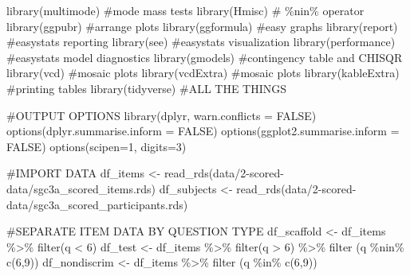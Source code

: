 \documentclass[
  letterpaper,
  DIV=11,
  numbers=noendperiod]{scrreprt}
\newenvironment{Shaded}{\begin{snugshade}}{\end{snugshade}}
\newcommand{\AttributeTok}[1]{\textcolor[rgb]{0.40,0.45,0.13}{#1}}
\newcommand{\CommentTok}[1]{\textcolor[rgb]{0.37,0.37,0.37}{#1}}
\newcommand{\ConstantTok}[1]{\textcolor[rgb]{0.56,0.35,0.01}{#1}}
\newcommand{\DecValTok}[1]{\textcolor[rgb]{0.68,0.00,0.00}{#1}}
\newcommand{\FunctionTok}[1]{\textcolor[rgb]{0.28,0.35,0.67}{#1}}
\newcommand{\NormalTok}[1]{\textcolor[rgb]{0.00,0.23,0.31}{#1}}
\newcommand{\OtherTok}[1]{\textcolor[rgb]{0.00,0.23,0.31}{#1}}
\newcommand{\SpecialCharTok}[1]{\textcolor[rgb]{0.37,0.37,0.37}{#1}}
\newcommand{\StringTok}[1]{\textcolor[rgb]{0.13,0.47,0.30}{#1}}
\begin{document}
\begin{Shaded}
\begin{Highlighting}[]
\FunctionTok{library}\NormalTok{(multimode) }\CommentTok{\#mode mass tests}
\FunctionTok{library}\NormalTok{(Hmisc) }\CommentTok{\# \%nin\% operator}
\FunctionTok{library}\NormalTok{(ggpubr) }\CommentTok{\#arrange plots}
\FunctionTok{library}\NormalTok{(ggformula) }\CommentTok{\#easy graphs}
\FunctionTok{library}\NormalTok{(report) }\CommentTok{\#easystats reporting}
\FunctionTok{library}\NormalTok{(see) }\CommentTok{\#easystats visualization}
\FunctionTok{library}\NormalTok{(performance) }\CommentTok{\#easystats model diagnostics}
\FunctionTok{library}\NormalTok{(gmodels) }\CommentTok{\#contingency table and CHISQR}
\FunctionTok{library}\NormalTok{(vcd) }\CommentTok{\#mosaic plots}
\FunctionTok{library}\NormalTok{(vcdExtra) }\CommentTok{\#mosaic plots}
\FunctionTok{library}\NormalTok{(kableExtra) }\CommentTok{\#printing tables }
\FunctionTok{library}\NormalTok{(tidyverse) }\CommentTok{\#ALL THE THINGS}


\CommentTok{\#OUTPUT OPTIONS}
\FunctionTok{library}\NormalTok{(dplyr, }\AttributeTok{warn.conflicts =} \ConstantTok{FALSE}\NormalTok{)}
\FunctionTok{options}\NormalTok{(}\AttributeTok{dplyr.summarise.inform =} \ConstantTok{FALSE}\NormalTok{)}
\FunctionTok{options}\NormalTok{(}\AttributeTok{ggplot2.summarise.inform =} \ConstantTok{FALSE}\NormalTok{)}
\FunctionTok{options}\NormalTok{(}\AttributeTok{scipen=}\DecValTok{1}\NormalTok{, }\AttributeTok{digits=}\DecValTok{3}\NormalTok{)}
\end{Highlighting}
\end{Shaded}

\begin{Shaded}
\begin{Highlighting}[]
\CommentTok{\#IMPORT DATA }
\NormalTok{df\_items }\OtherTok{\textless{}{-}} \FunctionTok{read\_rds}\NormalTok{(}\StringTok{\textquotesingle{}data/2{-}scored{-}data/sgc3a\_scored\_items.rds\textquotesingle{}}\NormalTok{)}
\NormalTok{df\_subjects }\OtherTok{\textless{}{-}} \FunctionTok{read\_rds}\NormalTok{(}\StringTok{\textquotesingle{}data/2{-}scored{-}data/sgc3a\_scored\_participants.rds\textquotesingle{}}\NormalTok{)}


\CommentTok{\#SEPARATE ITEM DATA BY QUESTION TYPE}
\NormalTok{df\_scaffold }\OtherTok{\textless{}{-}}\NormalTok{ df\_items }\SpecialCharTok{\%\textgreater{}\%} \FunctionTok{filter}\NormalTok{(q }\SpecialCharTok{\textless{}} \DecValTok{6}\NormalTok{)}
\NormalTok{df\_test }\OtherTok{\textless{}{-}}\NormalTok{ df\_items }\SpecialCharTok{\%\textgreater{}\%} \FunctionTok{filter}\NormalTok{(q }\SpecialCharTok{\textgreater{}} \DecValTok{6}\NormalTok{) }\SpecialCharTok{\%\textgreater{}\%} \FunctionTok{filter}\NormalTok{ (q }\SpecialCharTok{\%nin\%} \FunctionTok{c}\NormalTok{(}\DecValTok{6}\NormalTok{,}\DecValTok{9}\NormalTok{))}
\NormalTok{df\_nondiscrim }\OtherTok{\textless{}{-}}\NormalTok{ df\_items }\SpecialCharTok{\%\textgreater{}\%} \FunctionTok{filter}\NormalTok{ (q }\SpecialCharTok{\%in\%} \FunctionTok{c}\NormalTok{(}\DecValTok{6}\NormalTok{,}\DecValTok{9}\NormalTok{))}
\end{Highlighting}
\end{Shaded}
\end{document}
